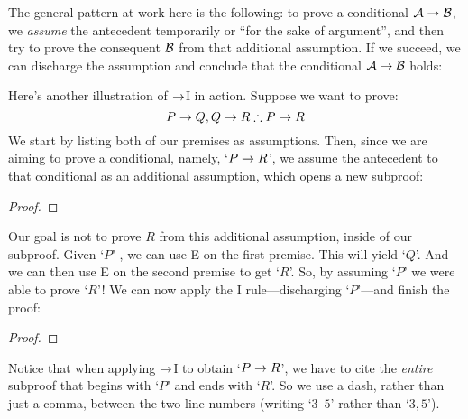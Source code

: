 The general pattern at work here is the following: to prove a conditional $\mathcal{A} \rightarrow \mathcal{B}$, we \emph{assume} the antecedent  temporarily or ``for the sake of argument'', and then try to prove the consequent $\mathcal{B}$ from that additional assumption. If we succeed, we can discharge the assumption and conclude that the conditional $\mathcal{A} \rightarrow \mathcal{B}$ holds:

Here's another illustration of $\rightarrow$I in action. Suppose we want to prove:
	$$P \rightarrow Q, Q \rightarrow R \therefore P \rightarrow R$$
We start by listing both of our premises as assumptions. Then, since we are aiming to prove a conditional, namely, `$P \rightarrow R$', we assume the antecedent to that conditional as an additional assumption, which opens a new subproof:
\begin{proof}
	\open
		\have[\ ]{}{\vdots}
	\close
\end{proof}
Our goal is not to prove $R$ from this additional assumption, inside of our subproof.  Given `$P$' , we can use {\eif}E on the first premise. This will yield `$Q$'. And we can then use {\eif}E on the second premise to get `$R$'. So, by assuming `$P$' we were able to prove `$R$'!  We can now apply the {\eif}I rule---discharging `$P$'---and finish the proof:\label{HSproof}
\begin{proof}
	\open
	\close
\end{proof}
Notice that when applying $\rightarrow$I to obtain `$P \rightarrow R$', we have to cite the \emph{entire} subproof that begins with `$P$' and ends with `$R$'.  So we use a dash, rather than just a comma, between the two line numbers (writing `$3$--$5$' rather than `$3,5$'). 

